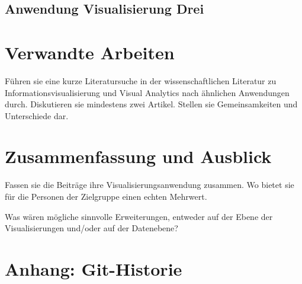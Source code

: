 \documentclass[usegeometry=true]{scrartcl}
\begin{document}
\subsection{Anwendung Visualisierung Drei}

\section{Verwandte Arbeiten}
Führen sie eine kurze Literatursuche in der wissenschaftlichen Literatur zu Informationsvisualisierung und Visual Analytics nach ähnlichen Anwendungen durch. Diskutieren sie mindestens zwei Artikel. Stellen sie Gemeinsamkeiten und Unterschiede dar.

\section{Zusammenfassung und Ausblick}
Fassen sie die Beiträge ihre Visualisierungsanwendung zusammen. Wo bietet sie für die Personen der Zielgruppe einen echten Mehrwert.

Was wären mögliche sinnvolle Erweiterungen, entweder auf der Ebene der Visualisierungen und/oder auf der Datenebene?

\section*{Anhang: Git-Historie}

\printbibliography
\end{document}
